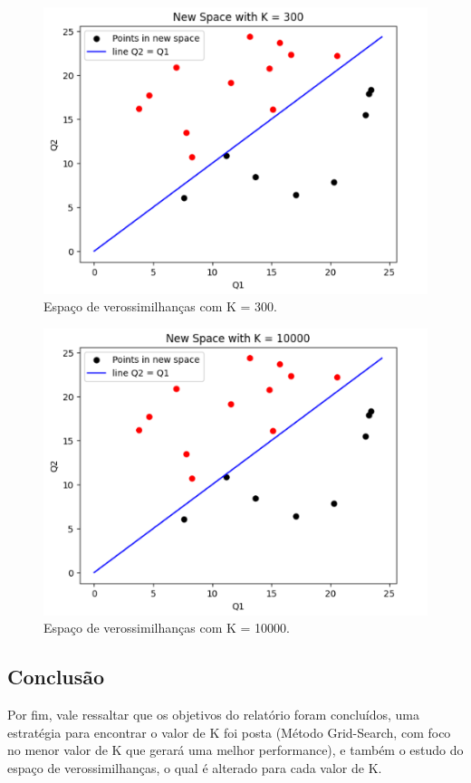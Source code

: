 \documentclass{article} %
\begin{document}
\begin{figure}[h] %
    \centering %
    \includegraphics[width=1\linewidth]{k300.png} %
    \caption{Espaço de verossimilhanças com K = 300.} %
    \label{fig:exemplo} %
\end{figure}

\begin{figure}[h] %
    \centering %
    \includegraphics[width=1\linewidth]{k10000.png} %
    \caption{Espaço de verossimilhanças com K = 10000.} %
    \label{fig:exemplo} %
\end{figure}

\subsection{Conclusão}

Por fim, vale ressaltar que os objetivos do relatório foram concluídos, uma estratégia para encontrar o valor de K foi posta (Método Grid-Search, com foco no menor valor de K que gerará uma melhor performance), e também o estudo do espaço de verossimilhanças, o qual é alterado para cada valor de K.
\end{document}
